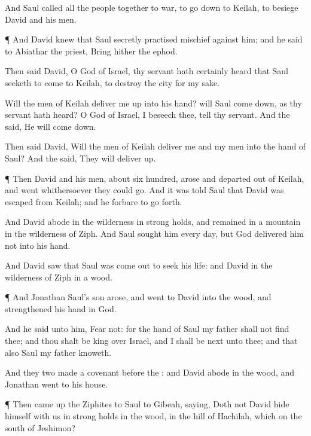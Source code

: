 {And
Saul
called all the
people
together to
war, to go
down to
Keilah, to
besiege
David and his
men.


\par }{\PP {}¶ And
David
knew that
Saul secretly
practised
mischief against him; and he
said to
Abiathar the
priest, Bring
hither the
ephod.

Then
said
David, O
{}
God of
Israel, thy
servant hath
certainly
heard that
Saul
seeketh to
come to
Keilah, to
destroy the
city for my sake.

Will the
men of
Keilah deliver me
up into his
hand? will
Saul come
down, as thy
servant hath
heard? O
{}
God of
Israel, I beseech thee,
tell thy
servant. And the
{}
said, He will come
down.

Then
said
David, Will the
men of
Keilah
deliver me and my
men into the
hand of
Saul? And the
{}
said, They will deliver
{}
up.


\par }{\PP {}¶ Then
David and his
men,
{} about
six
hundred,
arose and
departed out of
Keilah, and
went
whithersoever they could
go. And it was
told
Saul that
David was
escaped from
Keilah; and he
forbare to go
forth.


\par }{\PP {}And
David
abode in the
wilderness in strong
holds, and
remained in a
mountain in the
wilderness of
Ziph. And
Saul
sought him every
day, but
God
delivered him not into his
hand.

And
David
saw that
Saul was come
out to
seek his
life: and
David
{} in the
wilderness of
Ziph in a
wood.


\par }{\PP {}¶ And
Jonathan
Saul’s
son
arose, and
went to
David into the
wood, and
strengthened his
hand in
God.

And he
said unto him,
Fear not: for the
hand of
Saul my
father shall not
find thee; and thou shalt be
king over
Israel, and I shall be
next unto thee; and that also
Saul my
father
knoweth.

And they
two
made a
covenant
before the
{}: and
David
abode in the
wood, and
Jonathan
went to his
house.


\par }{\PP {}¶ Then came
up the
Ziphites to
Saul to
Gibeah,
saying, Doth not
David
hide himself with us in strong
holds in the
wood, in the
hill of
Hachilah, which
{} on the
south of
Jeshimon?

}
